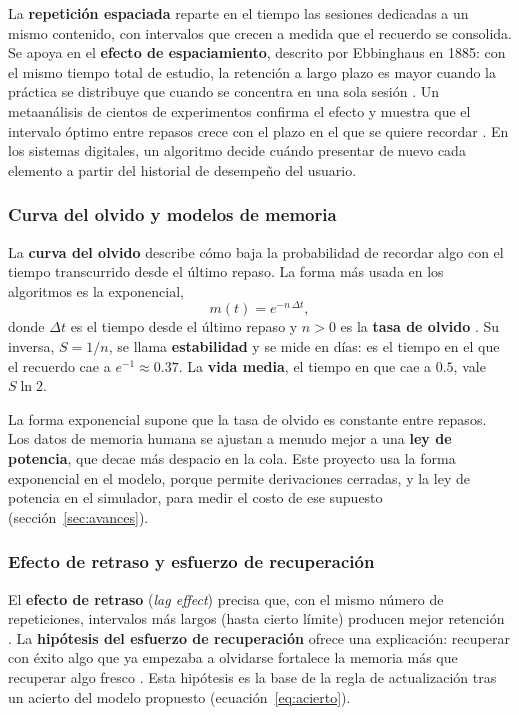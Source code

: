 \documentclass[12pt]{article}
\theoremstyle{definition}
\begin{document}
La \textbf{repetición espaciada} reparte en el tiempo las sesiones dedicadas a un mismo contenido, con intervalos que crecen a medida que el recuerdo se consolida. Se apoya en el \textbf{efecto de espaciamiento}, descrito por Ebbinghaus en 1885: con el mismo tiempo total de estudio, la retención a largo plazo es mayor cuando la práctica se distribuye que cuando se concentra en una sola sesión \citep{kang2016}. Un metaanálisis de cientos de experimentos confirma el efecto y muestra que el intervalo óptimo entre repasos crece con el plazo en el que se quiere recordar \citep{cepeda2006,cepeda2008}. En los sistemas digitales, un algoritmo decide cuándo presentar de nuevo cada elemento a partir del historial de desempeño del usuario.

\subsubsection{Curva del olvido y modelos de memoria}

La \textbf{curva del olvido} describe cómo baja la probabilidad de recordar algo con el tiempo transcurrido desde el último repaso. La forma más usada en los algoritmos es la exponencial,
\[
m(t)=e^{-n\,\Delta t},
\]
donde $\Delta t$ es el tiempo desde el último repaso y $n>0$ es la \textbf{tasa de olvido} \citep{settles2016,tabibian2019}. Su inversa, $S=1/n$, se llama \textbf{estabilidad} y se mide en días: es el tiempo en el que el recuerdo cae a $e^{-1}\approx0.37$. La \textbf{vida media}, el tiempo en que cae a $0.5$, vale $S\ln2$.

La forma exponencial supone que la tasa de olvido es constante entre repasos. Los datos de memoria humana se ajustan a menudo mejor a una \textbf{ley de potencia}, que decae más despacio en la cola. Este proyecto usa la forma exponencial en el modelo, porque permite derivaciones cerradas, y la ley de potencia en el simulador, para medir el costo de ese supuesto (sección~\ref{sec:avances}).

\subsubsection{Efecto de retraso y esfuerzo de recuperación}

El \textbf{efecto de retraso} (\emph{lag effect}) precisa que, con el mismo número de repeticiones, intervalos más largos (hasta cierto límite) producen mejor retención \citep{cepeda2008}. La \textbf{hipótesis del esfuerzo de recuperación} ofrece una explicación: recuperar con éxito algo que ya empezaba a olvidarse fortalece la memoria más que recuperar algo fresco \citep{pyc2009}. Esta hipótesis es la base de la regla de actualización tras un acierto del modelo propuesto (ecuación~\ref{eq:acierto}).
\end{document}
